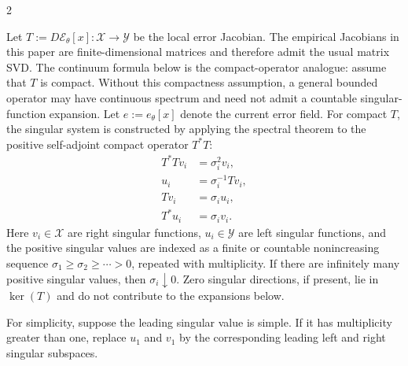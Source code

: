 \clearpage
{}
\begin{multicols}{2}

Let $T:=D\mathcal{E}_\theta[x]:\mathcal{X}\to\mathcal{Y}$ be the local error
Jacobian. The empirical Jacobians in this paper are finite-dimensional
matrices and therefore admit the usual matrix SVD. The continuum formula below
is the compact-operator analogue: assume that $T$ is compact. Without this
compactness assumption, a general bounded operator may have continuous
spectrum and need not admit a countable singular-function expansion. Let
$e:=e_\theta[x]$ denote the current error field. For compact $T$, the singular
system is constructed by applying the spectral theorem to the positive
self-adjoint compact operator $T^*T$:
\begin{equation}
  \begin{aligned}
    T^*T v_i &= \sigma_i^2 v_i,\\
    u_i &= \sigma_i^{-1}T v_i,\\
    T v_i &= \sigma_i u_i,\\
    T^*u_i &= \sigma_i v_i .
  \end{aligned}
\end{equation}
Here $v_i\in\mathcal{X}$ are right singular functions,
$u_i\in\mathcal{Y}$ are left singular functions, and the positive singular
values are indexed as a finite or countable nonincreasing sequence
$\sigma_1\ge\sigma_2\ge\cdots>0$, repeated with multiplicity. If there are
infinitely many positive singular values, then $\sigma_i\downarrow0$. Zero
singular directions, if present, lie in $\ker(T)$ and do not contribute to the
expansions below.

For simplicity, suppose the leading singular value is simple. If it has
multiplicity greater than one, replace $u_1$ and $v_1$ by the corresponding
leading left and right singular subspaces.


\end{multicols}
